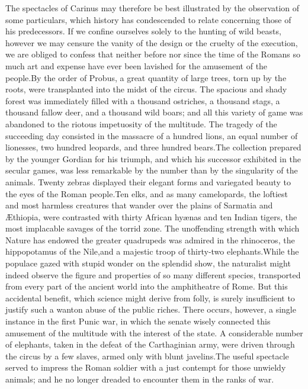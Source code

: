 
The spectacles of Carinus may therefore be best illustrated by
the observation of some particulars, which history has
condescended to relate concerning those of his predecessors. If
we confine ourselves solely to the hunting of wild beasts,
however we may censure the vanity of the design or the cruelty of
the execution, we are obliged to confess that neither before nor
since the time of the Romans so much art and expense have ever
been lavished for the amusement of the people.\footnotemark[85] By the order of
Probus, a great quantity of large trees, torn up by the roots,
were transplanted into the midst of the circus. The spacious and
shady forest was immediately filled with a thousand ostriches, a
thousand stags, a thousand fallow deer, and a thousand wild
boars; and all this variety of game was abandoned to the riotous
impetuosity of the multitude. The tragedy of the succeeding day
consisted in the massacre of a hundred lions, an equal number of
lionesses, two hundred leopards, and three hundred bears.\footnotemark[86] The
collection prepared by the younger Gordian for his triumph, and
which his successor exhibited in the secular games, was less
remarkable by the number than by the singularity of the animals.
Twenty zebras displayed their elegant forms and variegated beauty
to the eyes of the Roman people.\footnotemark[87] Ten elks, and as many
camelopards, the loftiest and most harmless creatures that wander
over the plains of Sarmatia and Æthiopia, were contrasted with
thirty African hyænas and ten Indian tigers, the most implacable
savages of the torrid zone. The unoffending strength with which
Nature has endowed the greater quadrupeds was admired in the
rhinoceros, the hippopotamus of the Nile,\footnotemark[88] and a majestic troop
of thirty-two elephants.\footnotemark[89] While the populace gazed with stupid
wonder on the splendid show, the naturalist might indeed observe
the figure and properties of so many different species,
transported from every part of the ancient world into the
amphitheatre of Rome. But this accidental benefit, which science
might derive from folly, is surely insufficient to justify such a
wanton abuse of the public riches. There occurs, however, a
single instance in the first Punic war, in which the senate
wisely connected this amusement of the multitude with the
interest of the state. A considerable number of elephants, taken
in the defeat of the Carthaginian army, were driven through the
circus by a few slaves, armed only with blunt javelins.\footnotemark[90] The
useful spectacle served to impress the Roman soldier with a just
contempt for those unwieldy animals; and he no longer dreaded to
encounter them in the ranks of war.

